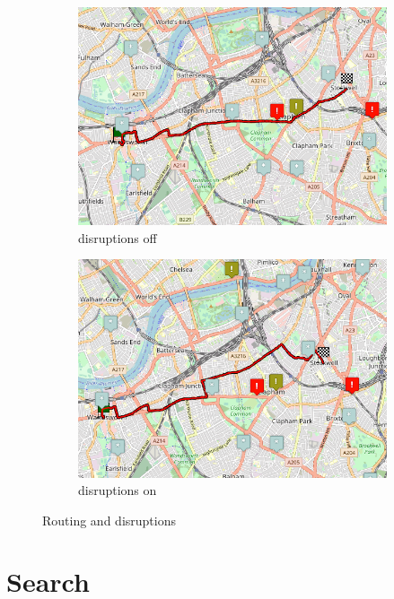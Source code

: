 \begin{figure}[H]
	\centering
	\begin{subfigure}[b]{0.48\textwidth}
		\centering
		\includegraphics[width=\textwidth]{assets/routing_without_disruptions.png}
		\caption{disruptions off}
	\end{subfigure}
	\hfill
	\begin{subfigure}[b]{0.48\textwidth}
		\centering
		\includegraphics[width=\textwidth]{assets/routing_with_disruptions.png}
		\caption{disruptions on}
	\end{subfigure}
	\caption[]{Routing and disruptions}
\end{figure}

\pagebreak

\section{Search}


